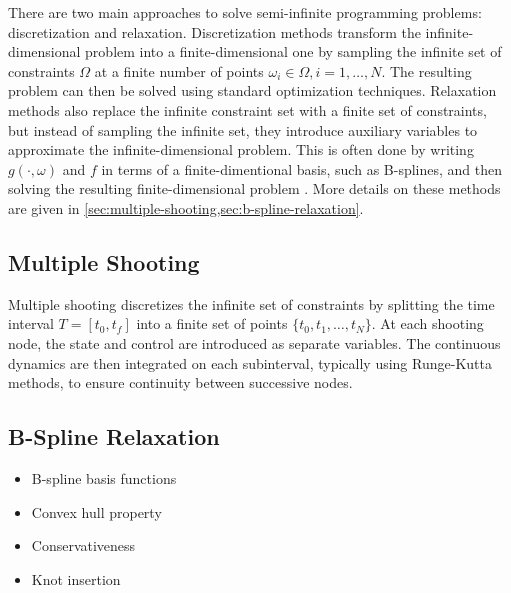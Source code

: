 There are two main approaches to solve semi-infinite programming problems: discretization and relaxation. Discretization methods transform the infinite-dimensional problem into a finite-dimensional one by sampling the infinite set of constraints $\Omega$ at a finite number of points $\omega_i \in \Omega, i = 1, \ldots, N$. The resulting problem can then be solved using standard optimization techniques. Relaxation methods also replace the infinite constraint set with a finite set of constraints, but instead of sampling the infinite set, they introduce auxiliary variables to approximate the infinite-dimensional problem. This is often done by writing $g(\cdot, \omega)$ and $f$ in terms of a finite-dimentional basis, such as B-splines, and then solving the resulting finite-dimensional problem \citep{Dierckx1993}. More details on these methods are given in \cref{sec:multiple-shooting,sec:b-spline-relaxation}.

\subsection{Multiple Shooting}\label{sec:multiple-shooting}
Multiple shooting discretizes the infinite set of constraints by splitting the time interval $T = [t_0,t_f]$ into a finite set of points $\{t_0, t_1, \ldots, t_N\}$. At each shooting node, the state and control are introduced as separate variables. The continuous dynamics are then integrated on each subinterval, typically using Runge-Kutta methods, to ensure continuity between successive nodes.
 
\subsection{B-Spline Relaxation}\label{sec:b-spline-relaxation}
\begin{itemize}
    \item B-spline basis functions
    \item Convex hull property
    \item Conservativeness
    \item Knot insertion
\end{itemize}
